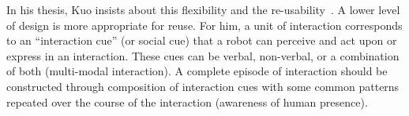 \documentclass[a4paper,11pt,twoside]{StyleThese}
\begin{document}
In his thesis, Kuo insists about this flexibility and the re-usability~\cite{kuo_2012_designing}. A lower level of design is more appropriate for reuse. For him, a unit of interaction corresponds to an ``interaction cue'' (or social cue) that a robot can perceive and act upon or express in an interaction. These cues can be verbal, non-verbal, or a combination of both (multi-modal interaction). A complete episode of interaction should be constructed through composition of interaction cues with some common patterns repeated over the course of the interaction (\eg awareness of human presence).

\begin{comment}
	
\subsection{Patterns of Interaction}\label{chap2:subsec:inter_patt}
Before talking about design patterns or interaction patterns, Goffman argued that human interactions follow a specific ``order'' and characterized a number of patterns in which people interact, such as how greetings unfold and how people leave an interaction~\cite{goffman_1983_interaction}.

Kahn \etal{} introduced design patterns~\cite{kahn_2008_design}, that they will later called interaction patterns in~\cite{kahn_2010_validating}, inspired from computer science. They proposed rules to follow using them and eight patterns. The most important ideas are that a sequence of patterns has to be well ordered and that patterns can be hierarchical. 
The 8 patterns: 
\begin{bulletList}
	\item The initial introduction: largely scripted, conventionally-established verbal and behavioral repertoire to recognize the other, inquire politely about the other, engage in some physical acknowledgment (\eg handshake)
	\item Didactic communication: one-way communication of information 
	\item In motion together: walk together
	\item Personal interests and history: sharing of personal interests and history with others
	\item Recovering from mistakes: creates the potential for both parties to maintain a social affiliation following the mistake
	\item Reciprocal turn-taking in game contextual: taking turns with one another when playing games
	\item Physical intimacy: to engage in holding or touching or embracing
	\item Claiming unfair treatment or wrongful harms: allows to make claim to its moral standing
\end{bulletList}



\end{comment}
\end{document}
